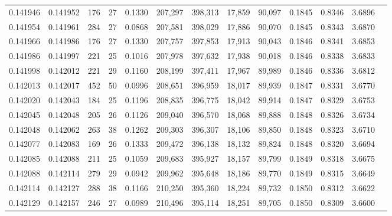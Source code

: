 \begin{tabular}{rrrrrrrrrrrrr}
0.141946 & 0.141952 &   176 &  27 &                                     0.1330 & 207,297 & 398,313 &  17,859 &  90,097 & 0.1845 & 0.8346 & 3.6896 \\
0.141954 & 0.141961 &   284 &  27 &                                     0.0868 & 207,581 & 398,029 &  17,886 &  90,070 & 0.1845 & 0.8343 & 3.6870 \\
0.141966 & 0.141986 &   176 &  27 &                                     0.1330 & 207,757 & 397,853 &  17,913 &  90,043 & 0.1846 & 0.8341 & 3.6853 \\
0.141986 & 0.141997 &   221 &  25 &                                     0.1016 & 207,978 & 397,632 &  17,938 &  90,018 & 0.1846 & 0.8338 & 3.6833 \\
0.141998 & 0.142012 &   221 &  29 &                                     0.1160 & 208,199 & 397,411 &  17,967 &  89,989 & 0.1846 & 0.8336 & 3.6812 \\
0.142013 & 0.142017 &   452 &  50 &                                     0.0996 & 208,651 & 396,959 &  18,017 &  89,939 & 0.1847 & 0.8331 & 3.6770 \\
0.142020 & 0.142043 &   184 &  25 &                                     0.1196 & 208,835 & 396,775 &  18,042 &  89,914 & 0.1847 & 0.8329 & 3.6753 \\
0.142045 & 0.142048 &   205 &  26 &                                     0.1126 & 209,040 & 396,570 &  18,068 &  89,888 & 0.1848 & 0.8326 & 3.6734 \\
0.142048 & 0.142062 &   263 &  38 &                                     0.1262 & 209,303 & 396,307 &  18,106 &  89,850 & 0.1848 & 0.8323 & 3.6710 \\
0.142077 & 0.142083 &   169 &  26 &                                     0.1333 & 209,472 & 396,138 &  18,132 &  89,824 & 0.1848 & 0.8320 & 3.6694 \\
0.142085 & 0.142088 &   211 &  25 &                                     0.1059 & 209,683 & 395,927 &  18,157 &  89,799 & 0.1849 & 0.8318 & 3.6675 \\
0.142088 & 0.142114 &   279 &  29 &                                     0.0942 & 209,962 & 395,648 &  18,186 &  89,770 & 0.1849 & 0.8315 & 3.6649 \\
0.142114 & 0.142127 &   288 &  38 &                                     0.1166 & 210,250 & 395,360 &  18,224 &  89,732 & 0.1850 & 0.8312 & 3.6622 \\
0.142129 & 0.142157 &   246 &  27 &                                     0.0989 & 210,496 & 395,114 &  18,251 &  89,705 & 0.1850 & 0.8309 & 3.6600 \\

\end{tabular}
